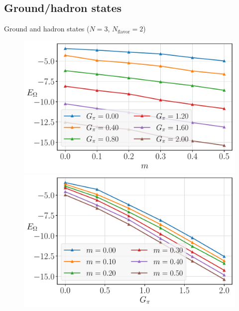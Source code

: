 
\subsection{Ground/hadron states}


\begin{frame}{Ground and hadron states ($N=3$, $N_\text{flavor}=2$)}

  \begin{figure}[!p]
  	\centering
  	\begin{minipage}[c]{.40\linewidth}
  		\centering
  		\includegraphics[width=\linewidth]{Figures/chapter06/g-Ev-curves}
  	\end{minipage}
    \hspace{.025\linewidth}
  	\begin{minipage}[c]{.40\linewidth}
  		\centering
  		\includegraphics[width=\linewidth]{Figures/chapter06/m-Ev-curves}
  	\end{minipage}
  \end{figure}


\end{frame}
